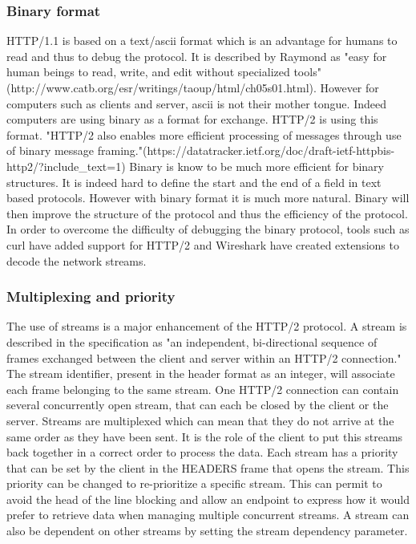 \subsubsection{Binary format}
HTTP/1.1 is based on a text/ascii format which is an advantage for humans to read and thus to debug the protocol. It is described by Raymond as "easy for human beings to read, write, and edit without specialized tools"(http://www.catb.org/esr/writings/taoup/html/ch05s01.html). However for computers such as clients and server, ascii is not their mother tongue. Indeed computers are using binary as a format for exchange. HTTP/2 is using this format.
"HTTP/2 also enables more efficient processing of messages through use of binary message framing."(https://datatracker.ietf.org/doc/draft-ietf-httpbis-http2/?include\_text=1) Binary is know to be much more efficient for binary structures. It is indeed hard to define the start and the end of a field in text based protocols. However with binary format it is much more natural. Binary will then improve the structure of the protocol and thus the efficiency of the protocol. In order to overcome the difficulty of debugging the binary protocol, tools such as curl have added support for HTTP/2 and Wireshark have created extensions to decode the network streams.

\subsubsection{Multiplexing and priority}
The use of streams is a major enhancement of the HTTP/2 protocol. A stream is described in the specification as "an independent, bi-directional sequence of frames exchanged between the client and server within an HTTP/2 connection." The stream identifier, present in the header format as an integer, will associate each frame belonging to the same stream. One HTTP/2 connection can contain several concurrently open stream, that can each be closed by the client or the server. Streams are multiplexed which can mean that they do not arrive at the same order as they have been sent. It is the role of the client to put this streams back together in a correct order to process the data. 
Each stream has a priority that can be set by the client in the HEADERS frame that opens the stream. This priority can be changed to re-prioritize a specific stream. This can permit to avoid the head of the line blocking and allow an endpoint to express how it would prefer to retrieve data when managing multiple concurrent streams.  A stream can also be dependent on other streams by setting the stream dependency parameter.

